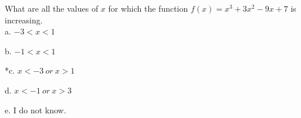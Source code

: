 
What are all the values of \( x \) for which the function \(f(x) = x^{3} + 3x^{2} - 9x + 7\) is increasing.\\

a. \(- 3 < x < 1\)

b. \(- 1 < x < 1\)

*c. \(x < - 3\ or\ x > 1\)

d. \(x < - 1\ or\ x > 3\)

e. I do not know.\\
